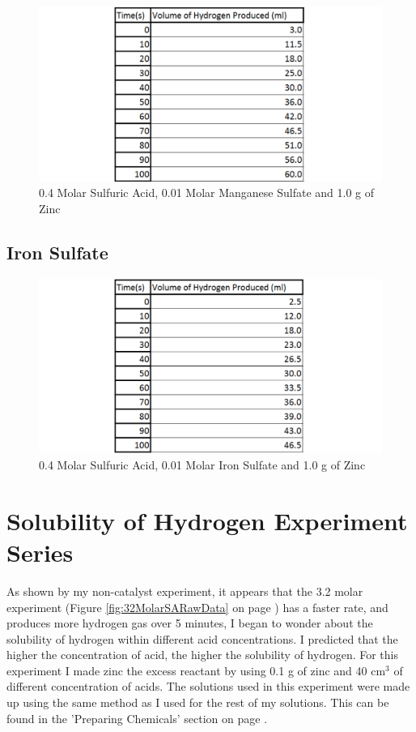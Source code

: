\begin{figure}[H]
    \includegraphics[width=\textwidth]{./Experiment/Images/4DifferentCatalysts/Manganese.pdf}
    \caption{0.4 Molar Sulfuric Acid, 0.01 Molar Manganese Sulfate and 1.0 g of Zinc} \label{fig:ManganeseRawData}
\end{figure}

	\subsection{Iron Sulfate}

\begin{figure}[H]
    \includegraphics[width=\textwidth]{./Experiment/Images/4DifferentCatalysts/Iron.pdf}
    \caption{0.4 Molar Sulfuric Acid, 0.01 Molar Iron Sulfate and 1.0 g of Zinc} \label{fig:IronRawData}
\end{figure}


\section{Solubility of Hydrogen Experiment Series}

As shown by my non-catalyst experiment, it appears that the 3.2 molar experiment (Figure \ref{fig:32MolarSARawData} on page \pageref{fig:32MolarSARawData}) has a faster rate, and produces more hydrogen gas over 5 minutes, I began to wonder about the solubility of hydrogen within different acid concentrations. I predicted that the higher the concentration of acid, the higher the solubility of hydrogen. For this experiment I made zinc the excess reactant by using 0.1 g of zinc and 40 cm$^3$ of different concentration of acids. The solutions used in this experiment were made up using the same method as I used for the rest of my solutions. This can be found in the 'Preparing Chemicals' section on page \pageref{Preparing Chemicals}.

